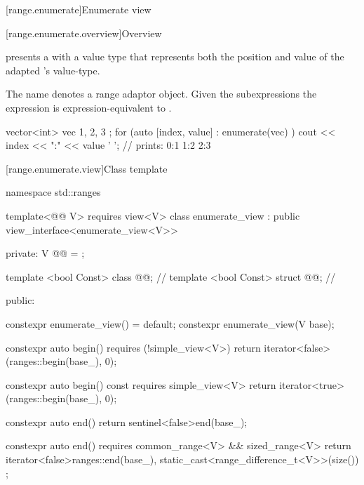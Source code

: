 \documentclass{wg21}
\begin{document}
\begin{addedblock}

[range.enumerate]{Enumerate view}

[range.enumerate.overview]{Overview}

\pnum
{} presents a  with a value type that represents both the position and value of the adapted 's value-type.

\pnum
The name  denotes a
range adaptor object.
Given the subexpressions 
the expression  is expression-equivalent to .

\pnum
\begin{example}
\begin{codeblock}
vector<int> vec{ 1, 2, 3 };
for (auto [index, value] : enumerate(vec) )
    cout << index << ":" << value ' '; // prints: 0:1 1:2 2:3
\end{codeblock}
\end{example}
        
[range.enumerate.view]{Class template }


\begin{codeblock}
namespace std::ranges {
    template<@@ V>
    requires view<V>
    class enumerate_view : public view_interface<enumerate_view<V>> {
    
      private:
        V @@ = {};
        
        template <bool Const>
        class @@; // \expos
        template <bool Const>
        struct @@; // \expos
        
       public:
        
        constexpr enumerate_view() = default;
        constexpr enumerate_view(V base);
        
        constexpr auto begin() requires (!simple_view<V>)
        { return iterator<false>(ranges::begin(base_), 0); }
        
        constexpr auto begin() const requires simple_view<V>
        { return iterator<true>(ranges::begin(base_), 0); }
        
        constexpr auto end()
        { return sentinel<false>{end(base_)}; }
        
        constexpr auto end()
        requires common_range<V> && sized_range<V>
        { return iterator<false>{ranges::end(base_), 
                 static_cast<range_difference_t<V>>(size()) }; }
        
}}
\end{codeblock}
\end{addedblock}
\end{document}
